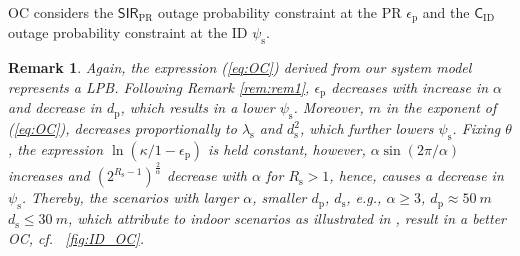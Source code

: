 \documentclass[conference, twocolumn]{IEEEtran}
\newcommand{\sub}[1]{_{\text{#1}}}
\newtheorem{remark}{Remark}
\begin{document}
OC considers the $\mathsf{SIR}\sub{PR}$ outage probability constraint at the PR $\epsilon\sub{p}$ and the $\mathsf{C}\sub{ID}$ outage probability constraint at the ID $\psi\sub{s}$. 
\begin{remark}
\normalfont
Again, the expression (\ref{eq:OC}) derived from our system model represents a LPB. Following Remark \ref{rem:rem1}, $\epsilon\sub{p}$ decreases with increase in $\alpha$ and decrease in $d\sub{p}$, which results in a lower $\psi\sub{s}$. Moreover, $m$ in the exponent of (\ref{eq:OC}), decreases proportionally to $\lambda\sub{s}$ and $d\sub{s}^2$, which further lowers $\psi\sub{s}$. Fixing $\theta$, the expression $\ln\left( \kappa/1 - \epsilon\sub{p} \right)$ is held constant, however, $\alpha \sin \left( 2 \pi/\alpha \right)$ increases and $(2^{R\sub{s} - 1})^{\frac{2}{\alpha}}$ decrease with $\alpha$ for $R\sub{s} > 1$, hence, causes a decrease in $\psi\sub{s}$. Thereby, the scenarios with larger $\alpha$, smaller $d\sub{p}$, $d\sub{s}$, e.g., $\alpha \ge 3$, $d\sub{p} \approx \SI{50}{m}$ $d\sub{s} \le \SI{30}{m}$, which attribute to indoor scenarios as illustrated in \cite{Kaushik13}, result in a better OC, cf. \figurename~\ref{fig:ID_OC}. 
\label{rem:rem3}
\end{remark}
\end{document}
